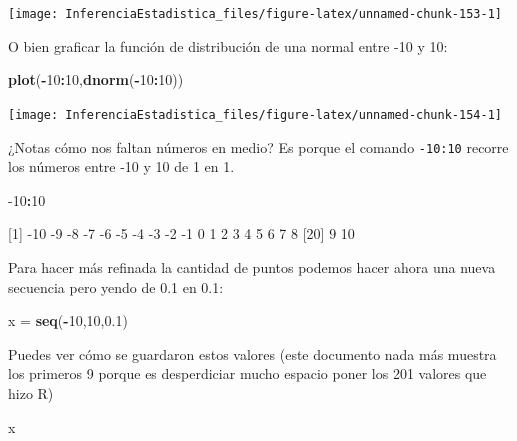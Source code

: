 \documentclass[
]{book}
\newenvironment{Shaded}{\begin{snugshade}}{\end{snugshade}}
\newcommand{\DecValTok}[1]{\textcolor[rgb]{0.00,0.00,0.81}{#1}}
\newcommand{\FloatTok}[1]{\textcolor[rgb]{0.00,0.00,0.81}{#1}}
\newcommand{\KeywordTok}[1]{\textcolor[rgb]{0.13,0.29,0.53}{\textbf{#1}}}
\newcommand{\NormalTok}[1]{#1}
\newcommand{\OperatorTok}[1]{\textcolor[rgb]{0.81,0.36,0.00}{\textbf{#1}}}
\newcommand{\StringTok}[1]{\textcolor[rgb]{0.31,0.60,0.02}{#1}}
\begin{document}
\begin{center}\texttt{[image: InferenciaEstadistica\_files/figure-latex/unnamed-chunk-153-1]} \end{center}

O bien graficar la función de distribución de una normal entre -10 y 10:

\begin{Shaded}
\begin{Highlighting}[]
\KeywordTok{plot}\NormalTok{(}\OperatorTok{-}\DecValTok{10}\OperatorTok{:}\DecValTok{10}\NormalTok{,}\KeywordTok{dnorm}\NormalTok{(}\OperatorTok{-}\DecValTok{10}\OperatorTok{:}\DecValTok{10}\NormalTok{))}
\end{Highlighting}
\end{Shaded}

\begin{center}\texttt{[image: InferenciaEstadistica\_files/figure-latex/unnamed-chunk-154-1]} \end{center}

¿Notas cómo nos faltan números en medio? Es porque el comando \texttt{-10:10} recorre los números entre -10 y 10 de 1 en 1.

\begin{Shaded}
\begin{Highlighting}[]
\DecValTok{-10}\OperatorTok{:}\DecValTok{10}
\end{Highlighting}
\end{Shaded}

{[}1{]} -10 -9 -8 -7 -6 -5 -4 -3 -2 -1 0 1 2 3 4 5 6 7 8
{[}20{]} 9 10

Para hacer más refinada la cantidad de puntos podemos hacer ahora una nueva secuencia pero yendo de 0.1 en 0.1:

\begin{Shaded}
\begin{Highlighting}[]
\NormalTok{x =}\StringTok{ }\KeywordTok{seq}\NormalTok{(}\OperatorTok{-}\DecValTok{10}\NormalTok{,}\DecValTok{10}\NormalTok{,}\FloatTok{0.1}\NormalTok{)}
\end{Highlighting}
\end{Shaded}

Puedes ver cómo se guardaron estos valores (este documento nada más muestra los primeros 9 porque es desperdiciar mucho espacio poner los 201 valores que hizo R)

\begin{Shaded}
\begin{Highlighting}[]
\NormalTok{x}
\end{Highlighting}
\end{Shaded}
\end{document}
